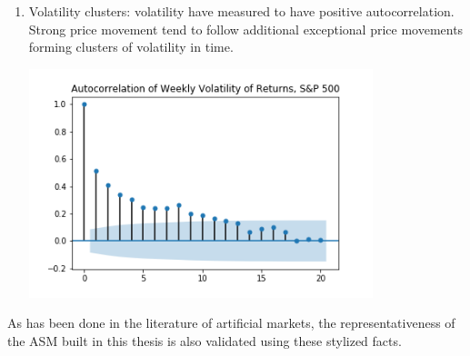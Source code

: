 \begin{enumerate}
    \item Volatility clusters: volatility have measured to have positive autocorrelation. Strong price movement tend to follow additional exceptional price movements forming clusters of volatility in time.
    \par
    \begin{minipage}{\linewidth}
        \centering
        \includegraphics[width=10cm]{plots/S&P500_vola_autocorr.png}
    \end{minipage}
\end{enumerate} 

As has been done in the literature of artificial markets, the representativeness
of the ASM built in this thesis is also validated using these stylized facts.
